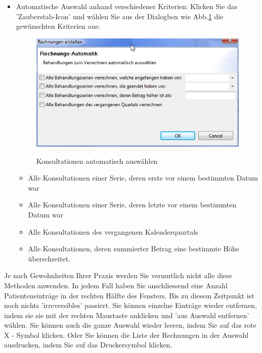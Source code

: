 \documentclass[a4paper]{scrartcl}
\begin{document}
\begin{itemize}
\item Automatische Auswahl anhand verschiedener Kriterien: Klicken Sie das 'Zauberstab-Icon' und wählen Sie aus der Dialogbox wie Abb.\ref{fig:abr9} die gewünschten Kriterien aus:
\begin{figure}
  \includegraphics{abr9}\\
  \caption{Konsultationen automatisch auswählen}\label{fig:abr9}
\end{figure}
\begin{itemize}
    \item Alle Konsultationen einer Serie, deren erste vor einem bestimmten Datum war
    \item Alle Konsultationen einer Serie, deren letzte vor einem bestimmten Datum war
    \item Alle Konsultationen des vergangenen Kalenderquartals
    \item Alle Konsultationen, deren summierter Betrag eine bestimmte Höhe überschreitet.
    \end{itemize}
\end{itemize}

Je nach Gewohnheiten Ihrer Praxis werden Sie vermutlich nicht alle diese Methoden anwenden. In jedem Fall haben Sie anschliessend eine Anzahl Patienteneinträge in der rechten Hälfte des Fensters. Bis zu diesem Zeitpunkt ist noch nichts 'irreversibles' passiert. Sie können einzelne Einträge wieder entfernen, indem sie sie mit der rechten Maustaste anklicken und 'aus Auswahl entfernen' wählen. Sie können auch die ganze Auswahl wieder leeren, indem Sie auf das rote X - Symbol klicken. Oder Sie können die Liste der Rechnungen in der Auswahl ausdrucken, indem Sie auf das Druckersymbol klicken.

\medskip
\end{document}
